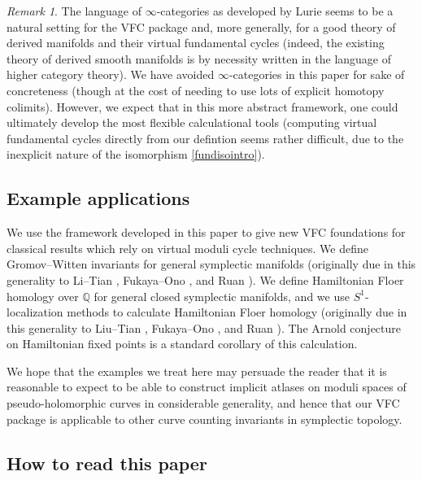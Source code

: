 \documentclass[12pt]{article}
\theoremstyle{definition}
\theoremstyle{remark}
\newtheorem{remark}[theorem]{Remark}
\numberwithin{equation}{subsection}
\newcommand{\QQ}{\mathbb Q}
\begin{document}
\begin{remark}\label{inftycategoriesbetter}
The language of $\infty$-categories as developed by Lurie \cite{luriehtt} seems to be a natural setting for the VFC package and, more generally, for a good theory of derived manifolds and their virtual fundamental cycles (indeed, the existing theory of derived smooth manifolds is by necessity written in the language of higher category theory).  We have avoided $\infty$-categories in this paper for sake of concreteness (though at the cost of needing to use lots of explicit homotopy colimits).  However, we expect that in this more abstract framework, one could ultimately develop the most flexible calculational tools (computing virtual fundamental cycles directly from our defintion seems rather difficult, due to the inexplicit nature of the isomorphism \eqref{fundisointro}).
\end{remark}

\subsection{Example applications}\label{applsec}

We use the framework developed in this paper to give new VFC foundations for classical results which rely on virtual moduli cycle techniques.  We define Gromov--Witten invariants for general symplectic manifolds (originally due in this generality to Li--Tian \cite{litianII}, Fukaya--Ono \cite{fukayaono}, and Ruan \cite{ruan}).  We define Hamiltonian Floer homology over $\QQ$ for general closed symplectic manifolds, and we use $S^1$-localization methods to calculate Hamiltonian Floer homology (originally due in this generality to Liu--Tian \cite{liutian}, Fukaya--Ono \cite{fukayaono}, and Ruan \cite{ruan}).  The Arnold conjecture on Hamiltonian fixed points is a standard corollary of this calculation.

We hope that the examples we treat here may persuade the reader that it is reasonable to expect to be able to construct implicit atlases on moduli spaces of pseudo-holomorphic curves in considerable generality, and hence that our VFC package is applicable to other curve counting invariants in symplectic topology.

\subsection{How to read this paper}
\end{document}
